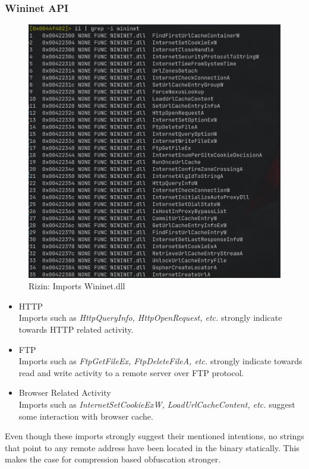 \documentclass[10pt,a4paper]{article}
\begin{document}
	\subsubsection{Wininet API}
		\begin{figure}[!htbp]%
			\centering
			\includegraphics[width=\columnwidth]{pics/wininet.png}
			\caption{Rizin: Imports Wininet.dll}
			\label{wininet}
		\end{figure}
		\begin{itemize}
			\item{HTTP}\\
				Imports such as \textit{HttpQueryInfo, HttpOpenRequest, etc.} strongly indicate towards HTTP related activity.
			\item{FTP}\\
				Imports such as \textit{FtpGetFileEx, FtpDeleteFileA, etc.} strongly indicate towards read and write activity
				to a remote server over FTP protocol.
			\item{Browser Related Activity}\\
				Imports such as \textit{InternetSetCookieExW, LoadUrlCacheContent, etc.} suggest some interaction with browser
				cache.
		\end{itemize}
		Even though these imports strongly suggest their mentioned intentions, no strings that point to any remote address
		have been located in the binary statically. This makes the case for compression based obfuscation stronger.
\end{document}
